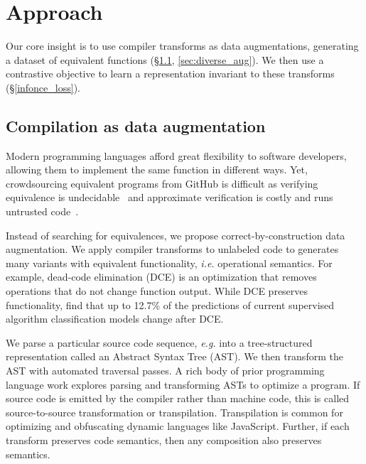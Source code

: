 \documentclass[11pt]{article}
\begin{document}
\section{Approach}

Our core insight is to use compiler transforms as data augmentations, generating a dataset of equivalent functions (\S\ref{sec:data_aug}, \ref{sec:diverse_aug}). We then use a contrastive objective to learn a representation invariant to these transforms (\S\ref{infonce_loss}).

\subsection{Compilation as data augmentation} \label{sec:data_aug}

Modern programming languages afford great flexibility to software developers, allowing them to implement the same function in different ways. Yet, crowdsourcing equivalent programs from GitHub is difficult as verifying equivalence is undecidable~\citep{10.1145/512529.512566, 10.1145/1168857.1168906} and approximate verification is costly and runs untrusted code~\citep{massalin1987superoptimizer}.



Instead of searching for equivalences, we propose correct-by-construction data augmentation. We apply compiler transforms to unlabeled code to generates many variants with equivalent functionality, \textit{i.e.} operational semantics.
For example, dead-code elimination (DCE) is an optimization that removes operations that do not change function output. While DCE preserves functionality, \citet{wang2019coset} find that up to 12.7\% of the predictions of current supervised algorithm classification models change after DCE.

We parse a particular source code sequence, \textit{e.g.}  into a tree-structured representation  called an Abstract Syntax Tree (AST).
We then transform the AST with automated traversal passes.
A rich body of prior programming language work explores parsing and transforming ASTs to optimize a program. If source code is emitted by the compiler rather than machine code, this is called source-to-source transformation or transpilation. Transpilation is common for optimizing and obfuscating dynamic languages like JavaScript. Further, if each transform preserves code semantics, then any composition also preserves semantics.
\end{document}
